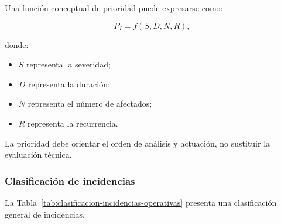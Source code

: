 Una función conceptual de prioridad puede expresarse como:

\[
    P_I
    =
    f
    \left(
        S,
        D,
        N,
        R
    \right),
\]

donde:

\begin{itemize}
    \item \(S\) representa la severidad;

    \item \(D\) representa la duración;

    \item \(N\) representa el número de afectados;

    \item \(R\) representa la recurrencia.
\end{itemize}

La prioridad debe orientar el orden de análisis y actuación, no sustituir
la evaluación técnica.


\subsubsection*{Clasificación de incidencias}

La Tabla~\ref{tab:clasificacion-incidencias-operativas} presenta una
clasificación general de incidencias.

